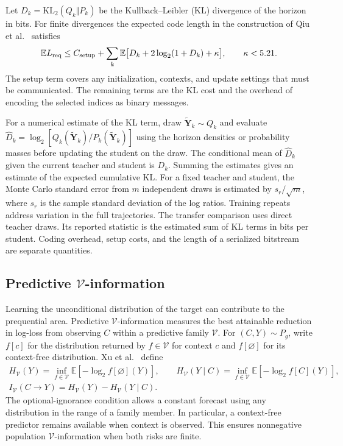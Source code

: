 \documentclass[10pt,a4paper]{article}
\theoremstyle{definition}
\begin{document}
Let $D_k=\mathrm{KL}_2(Q_k\Vert P_k)$ be the Kullback--Leibler (KL)
divergence of the horizon in bits. For finite divergences the expected
code length in the construction of Qiu et al.~\cite{qiu2026} satisfies
\begin{equation}
 \mathbb E L_{\rm req}\le C_{\rm setup}
 +\sum_k \mathbb E\bigl[D_k+2\log_2(1+D_k)+\kappa\bigr],
 \qquad \kappa<5.21.
 \label{eq:req}
\end{equation}
The setup term covers any initialization, contexts, and update settings
that must be communicated. The remaining terms are the KL cost and the
overhead of encoding the selected indices as binary messages.

For a numerical estimate of the KL term, draw
$\widetilde{\mathbf Y}_k\sim Q_k$ and evaluate
$\widehat D_k=\log_2[Q_k(\widetilde{\mathbf Y}_k)/P_k(\widetilde{\mathbf Y}_k)]$
using the horizon densities or probability masses before updating the student
on the draw. The conditional mean of $\widehat D_k$ given the current teacher
and student is $D_k$. Summing the estimates gives an estimate of the
expected cumulative KL. For a fixed teacher and student, the Monte Carlo
standard error from $m$ independent draws is estimated by
$s_r/\sqrt m$, where $s_r$ is the sample standard deviation of the log ratios.
Training repeats address variation in the full trajectories.
The transfer comparison uses direct teacher draws. Its reported statistic
is the estimated sum of KL terms in bits per student. Coding overhead, setup
costs, and the length of a serialized bitstream are separate quantities.

\subsection{Predictive \texorpdfstring{$\mathcal V$}{V}-information}\label{sec:v-information}
Learning the unconditional distribution of the target can contribute to
the prequential area.
Predictive $\mathcal V$-information measures the best attainable reduction
in log-loss from observing $C$ within a predictive family $\mathcal V$.
For $(C,Y)\sim P_g$, write $f[c]$ for the distribution returned by
$f\in\mathcal V$ for context $c$ and $f[\varnothing]$ for its context-free
distribution. Xu et al.~\cite{xu2020} define
\begin{equation}
 \begin{gathered}
 H_{\mathcal V}(Y)=\inf_{f\in\mathcal V}\mathbb E[-\log_2 f[\varnothing](Y)],
 \qquad H_{\mathcal V}(Y\mid C)=\inf_{f\in\mathcal V}\mathbb E[-\log_2 f[C](Y)],\\
 I_{\mathcal V}(C\to Y)=H_{\mathcal V}(Y)-H_{\mathcal V}(Y\mid C).
 \end{gathered}
\end{equation}
The optional-ignorance condition allows a constant forecast using any
distribution in the range of a family member. In particular, a
context-free predictor remains available when context is observed.
This ensures nonnegative population $\mathcal V$-information when both
risks are finite.
\end{document}
